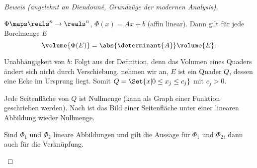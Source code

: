 \begin{proof}[Beweis (angelehnt an Diendonné, Grundzüge der modernen Analysis)]
\begin{subproof}
  \end{subproof}
  \begin{lemma}\label{affin_lineare_funzt_mit_borelmenge}
    \( \Phi\maps \reals^n\to \reals^n \), \( \Phi(x)=Ax+b \) (affin linear). Dann gilt für jede Borelmenge \( E \)
    \begin{equation*}
      \volume{\Phi(E)}=\abs{\determinant{A}}\volume{E}.
    \end{equation*}
  \end{lemma}
  \begin{subproof}
    Unabhängigkeit von \( b \): Folgt aus der Definition, denn das Volumen eines Quaders ändert sich nicht durch Verschiebung. \Obda nehmen wir an, \( E \) ist ein Quader \( Q \), dessen eine Ecke im Ursprung liegt. Somit \obda \( Q=\Set{x|0\leq x_j\leq c_j}\) mit \( c_j>0 \).

    Jede Seitenfläche von \( Q \) ist Nullmenge (kann als Graph einer Funktion geschrieben werden). Nach  ist das Bild einer Seitenfläche unter einer linearen Abbildung wieder Nullmenge.

    Sind \( \Phi_1 \) und \( \Phi_2 \) lineare Abbildungen und gilt die Aussage für \( \Phi_1 \) und \( \Phi_2 \), dann auch für die Verknüpfung.


\end{subproof}
\end{proof}
